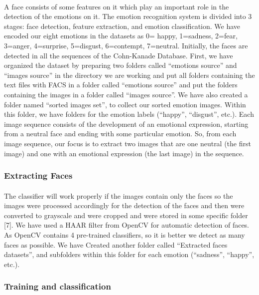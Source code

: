 \documentclass[a4paper,12pt,oneside]{article}
\begin{document}
\paragraph{}
A face consists of some features on it which play an
important role in the detection of the emotions on it. The
emotion recognition system is divided into 3 stages: face
detection, feature extraction, and emotion classification.
We have encoded our eight emotions in the datasets as
{0= happy, 1=sadness, 2=fear, 3=anger, 4=surprise,
5=disgust, 6=contempt, 7=neutral}. Initially, the faces
are detected in all the sequences of the Cohn-Kanade
Database. First, we have organized the dataset by
preparing two folders called “emotions source” and
“images source” in the directory we are working and put
all folders containing the text files with FACS in a folder
called “emotions source” and put the folders containing
the images in a folder called “images source”. We have
also created a folder named “sorted images set”, to
collect our sorted emotion images. Within this folder, we
have folders for the emotion labels (“happy”, “disgust”,
etc.). Each image sequence consists of the development
of an emotional expression, starting from a neutral face
and ending with some particular emotion. So, from each
image sequence, our focus is to extract two images that
are one neutral (the first image) and one with an
emotional expression (the last image) in the sequence.

\subsubsection{Extracting Faces}
\paragraph{}
The classifier will work properly if the images contain
only the faces so the images were processed accordingly
for the detection of the faces and then were converted to
grayscale and were cropped and were stored in some
specific folder [7]. We have used a HAAR filter from
OpenCV for automatic detection of faces. As OpenCV
contains 4 pre-trained classifiers, so it is better we detect
as many faces as possible. We have Created another
folder called “Extracted faces datasets”, and subfolders
within this folder for each emotion (“sadness”, “happy”,
etc.).

\subsubsection{Training and classification}
\end{document}
